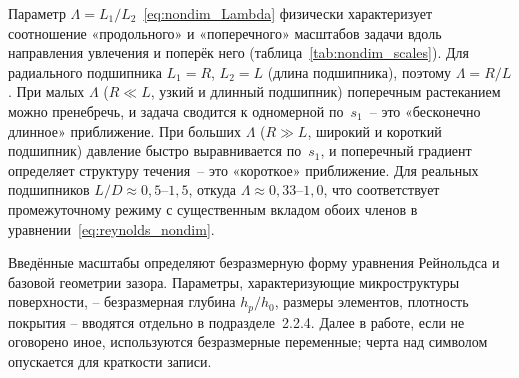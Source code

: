 Параметр $\Lambda = L_1/L_2$~\eqref{eq:nondim_Lambda}
физически характеризует соотношение «продольного»
и «поперечного» масштабов задачи вдоль направления увлечения
и поперёк него (таблица~\ref{tab:nondim_scales}).
Для радиального подшипника $L_1 = R$, $L_2 = L$ (длина
подшипника), поэтому $\Lambda = R/L$. При малых $\Lambda$
($R \ll L$, узкий и длинный подшипник) поперечным растеканием
можно пренебречь, и задача сводится к одномерной по~$s_1$~--
это «бесконечно длинное» приближение. При больших $\Lambda$
($R \gg L$, широкий и короткий подшипник) давление быстро
выравнивается по~$s_1$, и поперечный градиент определяет
структуру течения~-- это «короткое» приближение. Для реальных
подшипников $L/D \approx 0{,}5$--$1{,}5$, откуда
$\Lambda \approx 0{,}33$--$1{,}0$, что соответствует
промежуточному режиму с существенным вкладом обоих членов
в уравнении~\eqref{eq:reynolds_nondim}.

Введённые масштабы определяют безразмерную форму уравнения Рейнольдса и базовой геометрии зазора. Параметры, характеризующие микроструктуры поверхности, -- безразмерная глубина $h_p/h_0$, размеры элементов, плотность покрытия -- вводятся отдельно в подразделе~2.2.4. Далее в работе, если не оговорено иное, используются безразмерные переменные; черта над символом опускается для краткости записи.
